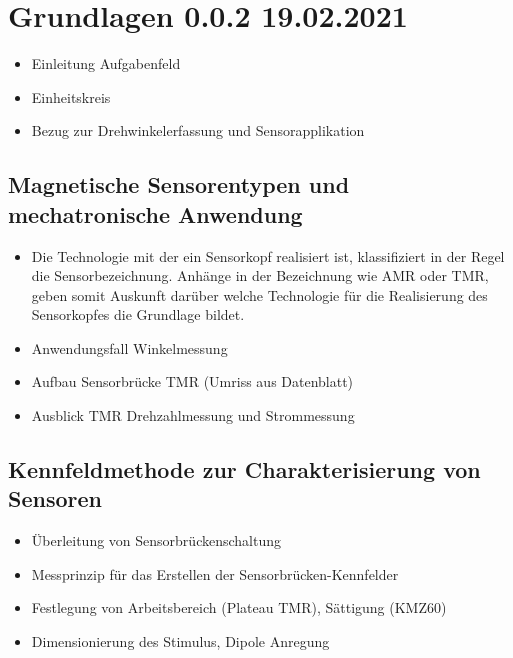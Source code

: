 %

\chapter{Grundlagen 0.0.2 19.02.2021}\label{ch:grundlagen}
	\begin{itemize}
		\item Einleitung Aufgabenfeld
		\item Einheitskreis
		\item Bezug zur Drehwinkelerfassung und Sensorapplikation
	\end{itemize}




\section{Magnetische Sensorentypen und mechatronische Anwendung}\label{sec:magnetische-sensorentypen}
	\begin{itemize}
		\item Die Technologie mit der ein Sensorkopf realisiert ist, klassifiziert in der Regel die Sensorbezeichnung. Anhänge in der Bezeichnung wie AMR oder TMR, geben somit Auskunft darüber welche Technologie für die Realisierung des Sensorkopfes die Grundlage bildet.
		\item Anwendungsfall Winkelmessung
		\item Aufbau Sensorbrücke TMR (Umriss aus Datenblatt)
		\item Ausblick TMR Drehzahlmessung und Strommessung
	\end{itemize}

\section{Kennfeldmethode zur Charakterisierung von Sensoren}\label{sec:kennfeldmethode-zur-charakterisierung}
	\begin{itemize}
		\item Überleitung von Sensorbrückenschaltung
		\item Messprinzip für das Erstellen der Sensorbrücken-Kennfelder
		\item Festlegung von Arbeitsbereich (Plateau TMR), Sättigung (KMZ60)
		\item Dimensionierung des Stimulus, Dipole Anregung
	\end{itemize}
	
